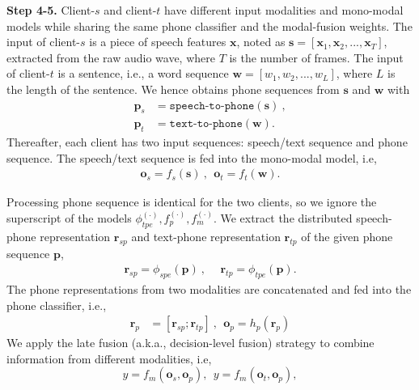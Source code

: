 \documentclass[11pt]{article}
\begin{document}
\textbf{Step 4-5.} Client-$s$ and client-$t$ have different input modalities and mono-modal models while sharing the same phone classifier and the modal-fusion weights. The input of client-$s$ is a piece of speech features $\mathbf{x}$, noted as $\mathbf{s}=\left[\mathbf{x}_1,\mathbf{x}_2,...,\mathbf{x}_T\right]$, extracted from the raw audio wave, where $T$ is the number of frames.  The input of client-$t$ is a sentence, i.e., a word sequence $\mathbf{w}=\left[w_1,w_2,...,w_L\right]$, where $L$ is the length of the sentence. We hence obtains phone sequences from $\mathbf{s}$ and $\mathbf{w}$ with
\begin{equation}
\begin{aligned}
  \mathbf{p}_s &= \texttt{speech-to-phone}(\mathbf{s})~,\\
  \mathbf{p}_t &=\texttt{text-to-phone}(\mathbf{w}).
\end{aligned}
\label{eq:1}
\end{equation}
Thereafter, each client has two input sequences: speech/text sequence and phone sequence. The speech/text sequence is fed into the mono-modal model, i.e,
\begin{equation}
\begin{aligned}
    \mathbf{o}_s = {f}_s(\mathbf{s})~,~~\mathbf{o}_t = {f}_t(\mathbf{w}).
\end{aligned}
\label{eq:2}
\end{equation}

Processing phone sequence is identical for the two clients, so we ignore the superscript of the models ${\phi}_{tpe}^{(\cdot)}, {f}_{p}^{(\cdot)}, {f}_m^{(\cdot)}$. We extract the distributed speech-phone representation $\mathbf{r}_{sp}$ and text-phone representation $\mathbf{r}_{tp}$ of the given phone sequence $\mathbf{p}$,
\begin{align}
    \mathbf{r}_{sp}  = \phi_{spe}(\mathbf{p})~,&~~\mathbf{r}_{tp} = \phi_{tpe}(\mathbf{p}).
\end{align}
The phone representations from two modalities are concatenated and fed into the phone classifier, i.e.,
\begin{align}
    \mathbf{r}_{p} &= [\mathbf{r}_{sp};\mathbf{r}_{tp}]~,~~\mathbf{o}_p = h_p(\mathbf{r}_{p})
\end{align}
We apply the late fusion (a.k.a., decision-level fusion) strategy \cite{zadeh2017tensor} to combine information from different modalities, i.e,
\begin{equation}
    y = {f}_{m}(\mathbf{o}_{s}, \mathbf{o}_p),~~y = {f}_{m}(\mathbf{o}_{t}, \mathbf{o}_p), \label{eq:7}
\end{equation}
\end{document}
